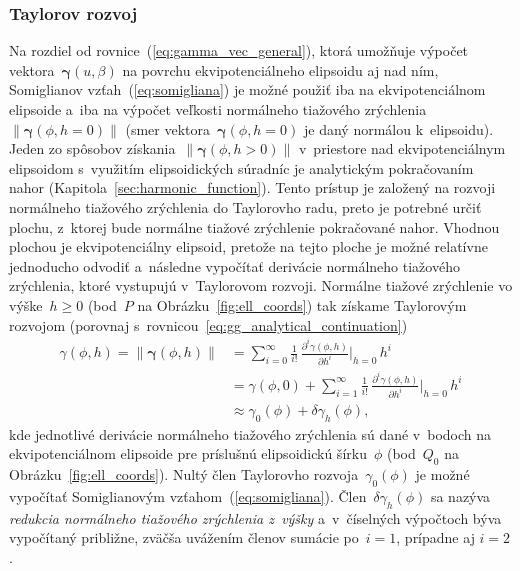 \documentclass[a4paper, 12pt]{book}
\begin{document}
\subsubsection{Taylorov rozvoj}
\label{sec:normal_gravity_taylor_expansion}

Na rozdiel od rovnice~(\ref{eq:gamma_vec_general}), ktorá umožňuje výpočet 
vektora~$\boldsymbol \gamma(u, \beta)$ na povrchu ekvipotenciálneho elipsoidu 
aj nad ním, Somiglianov vzťah~(\ref{eq:somigliana}) je možné použiť iba na 
ekvipotenciálnom elipsoide a~iba na výpočet veľkosti normálneho tiažového 
zrýchlenia~$\| \boldsymbol \gamma(\phi, h = 0) \|$ (smer vektora~$\boldsymbol 
\gamma(\phi, h = 0)$ je daný normálou k~elipsoidu).  Jeden zo spôsobov 
získania~$\| \boldsymbol \gamma(\phi, h > 0) \|$ v~priestore nad 
ekvipotenciálnym elipsoidom s~využitím elipsoidických súradníc je analytickým 
pokračovaním nahor (Kapitola~\ref{sec:harmonic_function}).  Tento prístup je 
založený na rozvoji normálneho tiažového zrýchlenia do Taylorovho radu, preto 
je potrebné určiť plochu, z~ktorej bude normálne tiažové zrýchlenie pokračované 
nahor.  Vhodnou plochou je ekvipotenciálny elipsoid, pretože na tejto ploche je 
možné relatívne jednoducho odvodiť a~následne vypočítať derivácie normálneho 
tiažového zrýchlenia, ktoré vystupujú v~Taylorovom rozvoji.  Normálne tiažové 
zrýchlenie vo výške~$h \geq 0$ (bod~$P$ na Obrázku~\ref{fig:ell_coords}) tak 
získame Taylorovým rozvojom (porovnaj 
s~rovnicou~\ref{eq:gg_analytical_continuation})
%
\begin{equation}
\label{eq:gamma_taylor}
\begin{split}
\gamma(\phi, h) = \| \boldsymbol \gamma(\phi, h) \| &= \sum_{i = 0}^{\infty} 
\frac{1}{i!} \, \frac{\partial^i \gamma(\phi, h)}{\partial h^i} \bigg\lvert_{h 
= 0} \, h^i\\
%
&= \gamma(\phi, 0) + \sum_{i = 1}^{\infty} \frac{1}{i!} \, \frac{\partial^i 
\gamma(\phi, h)}{\partial h^i} \bigg\lvert_{h = 0} \, h^i\\
%
&\approx \gamma_0(\phi) + \delta\gamma_h(\phi){,}
\end{split}
\end{equation}
%
kde jednotlivé derivácie normálneho tiažového zrýchlenia sú dané v~bodoch na 
ekvipotenciálnom elipsoide pre príslušnú elipsoidickú šírku~$\phi$ (bod~$Q_0$ 
na Obrázku~\ref{fig:ell_coords}).  Nultý člen Taylorovho 
rozvoja~$\gamma_0(\phi)$ je možné vypočítať Somiglianovým 
vzťahom~(\ref{eq:somigliana}).  Člen~$\delta\gamma_h(\phi)$ sa nazýva 
\emph{redukcia normálneho tiažového zrýchlenia z~výšky} a~v~číselných výpočtoch 
býva vypočítaný približne, zväčša uvážením členov sumácie po~$i = 1$, prípadne 
aj $i = 2$.
\end{document}
